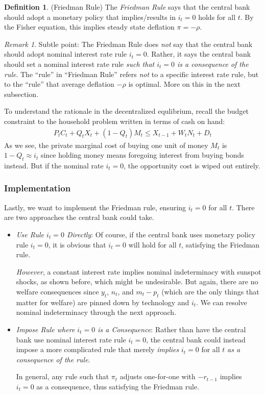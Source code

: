 \documentclass[12pt]{article}
\theoremstyle{plain}
\theoremstyle{definition}
\newtheorem{defn}[thm]{Definition}
\theoremstyle{remark}
\newtheorem*{rmk}{Remark}
\begin{document}
\begin{defn}(Friedman Rule)
The \emph{Friedman Rule} says that the central bank should adopt a
monetary policy that implies/results in $i_t=0$ holds for all $t$.
By the Fisher equation, this implies steady state deflation $\pi=-\rho$.
\end{defn}
\begin{rmk}
Subtle point:
The Friedman Rule does \emph{not} say that the central bank should adopt
nominal interest rate rule $i_t=0$. Rather, it says the central bank
should set a nominal interest rate rule
\emph{such that $i_t=0$ is a consequence of the rule}.
The ``rule'' in ``Friedman Rule'' refers \emph{not} to a specific
interest rate rule, but to the ``rule'' that average deflation $-\rho$
is optimal. More on this in the next subsection.
\end{rmk}

To understand the rationale in the decentralized equlibrium, recall the
budget constraint to the household problem written in terms of cash on
hand:
\begin{align*}
  P_tC_t
  + Q_{t}X_t
  + (1-Q_{t})M_t
  \leq X_{t-1} + W_tN_t + D_t
\end{align*}
As we see, the private marginal cost of buying one unit of money $M_t$
is $1-Q_t\approx i_t$ since holding money means foregoing interest
from buying bonds instead.
But if the nominal rate $i_t=0$, the opportunity cost is wiped out
entirely.


\clearpage
\subsubsection{Implementation}

Lastly, we want to implement the Friedman rule, ensuring $i_t=0$ for all
$t$. There are two approaches the central bank could take.
\begin{itemize}
  \item \emph{Use Rule $i_t=0$ Directly}:
    Of course, if the central bank uses monetary policy rule $i_t=0$, it
    is obvious that $i_t=0$ will hold for all $t$, satisfying the
    Friedman rule.

    \emph{However}, a constant interest rate implies nominal
    indeterminacy with sunspot shocks, as shown before, which might be
    undesirable. But again, there are no welfare consequences since
    $y_t$, $n_t$, and $m_t-p_t$ (which are the only things that matter
    for welfare) are pinned down by technology and $i_t$. We can resolve
    nominal indeterminacy through the next approach.

  \item \emph{Impose Rule where $i_t=0$ is a Consequence}:
    Rather than have the central bank use nominal interest rate rule
    $i_t=0$, the central bank could instead impose a more complicated
    rule that merely \emph{implies} $i_t=0$ for all $t$
    \emph{as a consequence of the rule}.

    In general, any rule such that $\pi_t$ adjusts one-for-one with
    $-r_{t-1}$ implies $i_t=0$ as a consequence, thus satisfying the
    Friedman rule.

\end{itemize}
\end{document}
